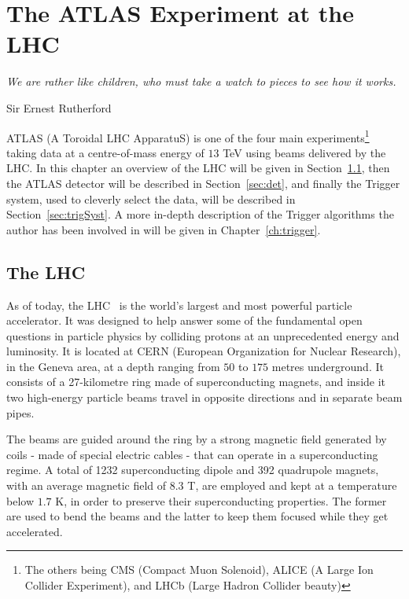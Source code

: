 \chapter{The ATLAS Experiment at the LHC}
\label{ch:detector}
\epigraph{\emph{We are rather like children, who must take a watch to pieces to see how it works.}}{Sir Ernest Rutherford}

	\acs{ATLAS} (A Toroidal LHC ApparatuS) is one of the four main experiments\footnote{The others being CMS (Compact Muon Solenoid), ALICE (A Large Ion Collider Experiment), and LHCb (Large Hadron Collider beauty)} taking data at a centre-of-mass energy of $13$ TeV using beams delivered by the \ac{LHC}. In this chapter an overview of the \ac{LHC} will be given in Section~\ref{sec:lhc}, then the \ac{ATLAS} detector will be described in Section~\ref{sec:det}, and finally the Trigger system, used to cleverly select the data, will be described in Section~\ref{sec:trigSyst}. A more in-depth description of the Trigger algorithms the author has been involved in will be given in Chapter~\ref{ch:trigger}.


	\section{The LHC}
	\label{sec:lhc}
	
		As of today, the \ac{LHC}~\cite{LHCDesignReport} is the world’s largest and most powerful particle accelerator. It was designed to help answer some of the fundamental open questions in particle physics by colliding protons at an unprecedented energy and luminosity. It is located at \ac{CERN} (European Organization for Nuclear Research), in the Geneva area, at a depth ranging from $50$ to $175$ metres underground. It consists of a 27-kilometre ring made of superconducting magnets, and inside it two high-energy particle beams travel in opposite directions and in separate beam pipes. 

		The beams are guided around the ring by a strong magnetic field generated by coils - made of special electric cables - that can operate in a superconducting regime. A total of 1232 superconducting dipole and 392 quadrupole magnets, with an average magnetic field of $8.3$ T, are employed and kept at a temperature below $1.7$ K, in order to preserve their superconducting properties. The former are used to bend the beams and the latter to keep them focused while they get accelerated. 
		
